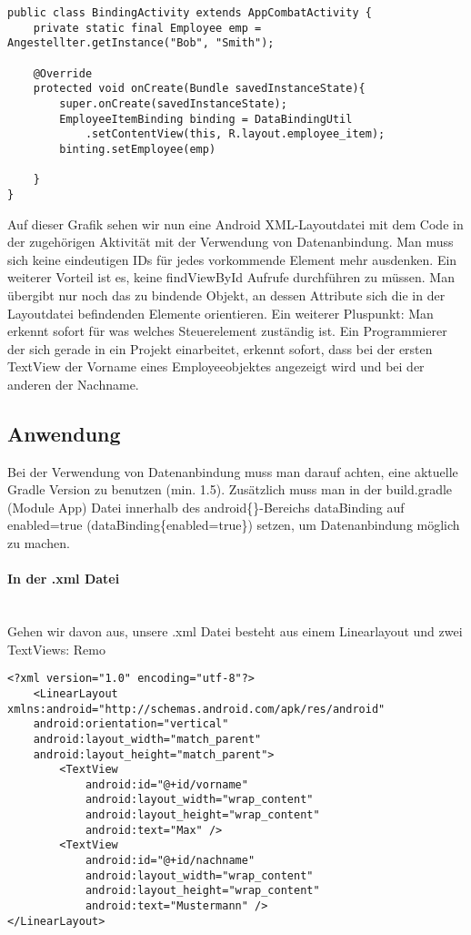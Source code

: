 \documentclass[FIPLY_base.tex]{subfiles}
\begin{document}
\begin{lstlisting}[caption={Die Activity vor dem Einsatz von DataBinding.},label=DescriptiveLabel]
public class BindingActivity extends AppCombatActivity {
	private static final Employee emp = Angestellter.getInstance("Bob", "Smith");

	@Override
	protected void onCreate(Bundle savedInstanceState){
		super.onCreate(savedInstanceState);
		EmployeeItemBinding binding = DataBindingUtil
			.setContentView(this, R.layout.employee_item);
		binting.setEmployee(emp)

	}
}
\end{lstlisting}


Auf dieser Grafik sehen wir nun eine Android XML-Layoutdatei mit dem Code in der zugehörigen Aktivität mit der Verwendung von Datenanbindung. Man muss sich keine eindeutigen IDs für jedes vorkommende Element mehr ausdenken. Ein weiterer Vorteil ist es, keine findViewById Aufrufe durchführen zu müssen. Man übergibt nur noch das zu bindende Objekt, an dessen Attribute sich die in der Layoutdatei befindenden Elemente orientieren. 
Ein weiterer Pluspunkt: Man erkennt sofort für was welches Steuerelement zuständig ist. Ein Programmierer der sich gerade in ein Projekt einarbeitet, erkennt sofort, dass bei der ersten TextView der Vorname eines Employeeobjektes angezeigt wird und bei der anderen der Nachname.


\subsection{Anwendung}
Bei der Verwendung von Datenanbindung muss man darauf achten, eine aktuelle Gradle Version zu benutzen (min. 1.5). Zusätzlich muss man in der build.gradle (Module App) Datei innerhalb des android\{\}-Bereichs dataBinding auf enabled=true (dataBinding\{enabled=true\}) setzen, um Datenanbindung möglich zu machen.
\paragraph{In der .xml Datei}
\ \\
Gehen wir davon aus, unsere .xml Datei besteht aus einem Linearlayout und zwei TextViews: Remo

\begin{lstlisting}[caption={Layoutcode ohne jedliche Datenanbindung.},label=DescriptiveLabel]
<?xml version="1.0" encoding="utf-8"?>
	<LinearLayout xmlns:android="http://schemas.android.com/apk/res/android"
	android:orientation="vertical"
	android:layout_width="match_parent"
	android:layout_height="match_parent">
		<TextView
			android:id="@+id/vorname"
			android:layout_width="wrap_content"
			android:layout_height="wrap_content"
			android:text="Max" />
		<TextView
			android:id="@+id/nachname"
			android:layout_width="wrap_content"
			android:layout_height="wrap_content"
			android:text="Mustermann" />
</LinearLayout>

\end{lstlisting}
\end{document}
